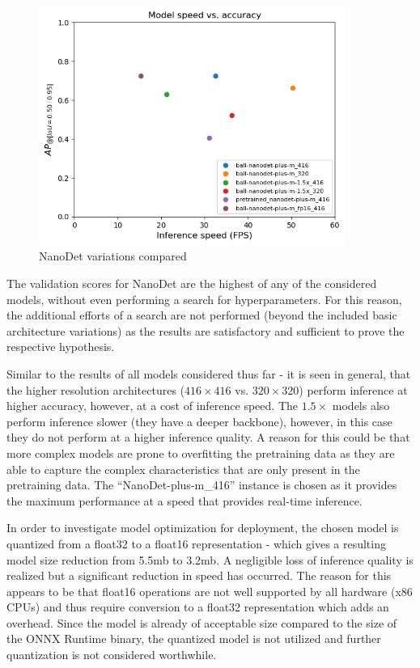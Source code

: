 \documentclass[a4paper,twoside,12pt]{report}
\begin{document}
\begin{figure}[h!]
\begin{center}
\includegraphics[width=10cm]{images/nanodet_compare.png}
\caption{NanoDet variations compared}
\label{fig:nanodet_compare}
\end{center}
\end{figure}

The validation scores for NanoDet are the highest of any of the considered models, without even performing a search for hyperparameters. For this reason, the additional efforts of a search are not performed (beyond the included basic architecture variations) as the results are satisfactory and sufficient to prove the respective hypothesis. 

Similar to the results of all models considered thus far - it is seen in general, that the higher resolution architectures ($416 \times 416$ vs. $320 \times 320$) perform inference at higher accuracy, however, at a cost of inference speed. The $1.5\times$ models also perform inference slower (they have a deeper backbone), however, in this case they do not perform at a higher inference quality. A reason for this could be that more complex models are prone to overfitting the pretraining data as they are able to capture the complex characteristics that are only present in the pretraining data. The ``NanoDet-plus-m\_416'' instance is chosen as it provides the maximum performance at a speed that provides real-time inference.


In order to investigate model optimization for deployment, the chosen model is quantized from a float32 to a float16 representation - which gives a resulting model size reduction from 5.5mb to 3.2mb. A negligible loss of inference quality is realized but a significant reduction in speed has occurred. The reason for this appears to be that float16 operations are not well supported by all hardware (x86 CPUs) and thus require conversion to a float32 representation which adds an overhead. Since the model is already of acceptable size compared to the size of the ONNX Runtime binary, the quantized model is not utilized and further quantization is not considered worthwhile.
\end{document}
